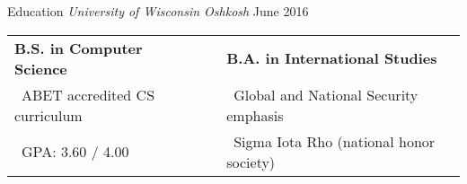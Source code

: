\cventry
    {Education}
    {\textnormal{\textit{University of Wisconsin Oshkosh}}}
    {}
    {June 2016}
    {}
    {\begin{tabular}{lcl}
        \textbf{B.S. in Computer Science} & \hspace{3em} & \textbf{B.A. in International Studies}\\
        \ ABET accredited CS curriculum & & \ Global and National Security
        emphasis\\
        \ GPA: 3.60 / 4.00 & & \ Sigma Iota Rho (national honor society)
    \end{tabular}}
